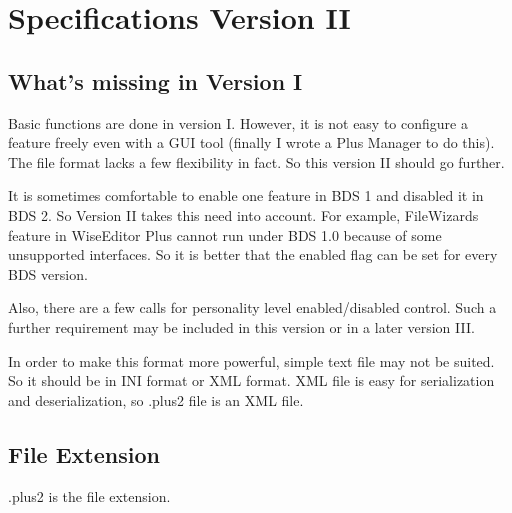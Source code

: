 \section{Specifications Version II}

\subsection{What's missing in Version I}
Basic functions are done in version I. However, it is not easy to configure a
feature freely even with a GUI tool (finally I wrote a Plus Manager to do
this). The file format lacks a few flexibility in fact. So this version II
should go further.

It is sometimes comfortable to enable one feature in BDS 1 and disabled it in
BDS 2. So Version II takes this need into account. For example, FileWizards
feature in WiseEditor Plus cannot run under BDS 1.0 because of some unsupported
interfaces. So it is better that the enabled flag can be set for every BDS
version.

Also, there are a few calls for personality level enabled/disabled control.
Such a further requirement may be included in this version or in a later
version III.

In order to make this format more powerful, simple text file may not be suited.
So it should be in INI format or XML format. XML file is easy for serialization
and deserialization, so .plus2 file is an XML file.

\subsection{File Extension}
.plus2 is the file extension.


